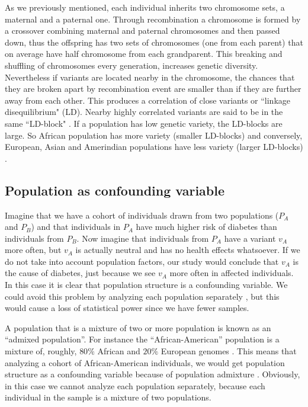 As we previously mentioned, each individual inherits two chromosome sets, a maternal and a paternal one. Through recombination a chromosome is formed by a crossover combining maternal and paternal chromosomes and then passed down, thus the offspring has two sets of chromosomes (one from each parent) that on average have half chromosome from each grandparent. This breaking and shuffling of chromosomes every generation, increases genetic diversity. Nevertheless if variants are located nearby in the chromosome, the chances that they are broken apart by recombination event are smaller than if they are further away from each other. This produces a correlation of close variants or ``linkage disequilibrium" (LD). Nearby highly correlated variants are said to be in the same ``LD-block" \cite{hartl1997principles}. If a population has low genetic variety, the LD-blocks are large. So African population has more variety (smaller LD-blocks) and conversely, European, Asian and Amerindian populations have less variety (larger LD-blocks) \cite{hartl1997principles}.

\subsection{Population as confounding variable }

Imagine that we have a cohort of individuals drawn from two populations ($P_A$ and $P_B$) and that individuals in $P_A$ have much higher risk of diabetes than individuals from $P_B$. Now imagine that individuals from $P_A$ have a variant $v_A$ more often, but $v_A$ is actually neutral and has no health effects whatsoever. If we do not take into account population factors, our study would conclude that $v_A$ is the cause of diabetes, just because we see $v_A$ more often in affected individuals. In this case it is clear that population structure is a confounding variable. We could avoid this problem by analyzing each population separately \cite{patterson2006population}, but this would cause a loss of statistical power since we have fewer samples.

A population that is a mixture of two or more population is known as an ``admixed population''. For instance the ``African-American'' population is a mixture of, roughly, $80\%$ African and $20\%$ European genomes \cite{hartl1997principles,balding2006tutorial}. This means that analyzing a cohort of African-American individuals, we would get population structure as a confounding variable because of population admixture \cite{hartl1997principles}. Obviously, in this case we cannot analyze each population separately, because each individual in the sample is a mixture of two populations.

